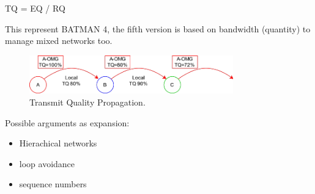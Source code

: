 \documentclass{article}
\begin{document}
TQ = EQ / RQ

This represent BATMAN 4, the fifth version is based on bandwidth (quantity) to manage mixed networks too.


\begin{figure}
  \includegraphics[width=250pt]{img/A-OGM-multi.pdf}
  \caption{Transmit Quality Propagation.}
  \label{fig:DVdsaf}
\end{figure}


Possible arguments as expansion:
\begin{itemize}
    \item Hierachical networks
    \item loop avoidance
    \item sequence numbers
\end{itemize}















%
%
\end{document}
